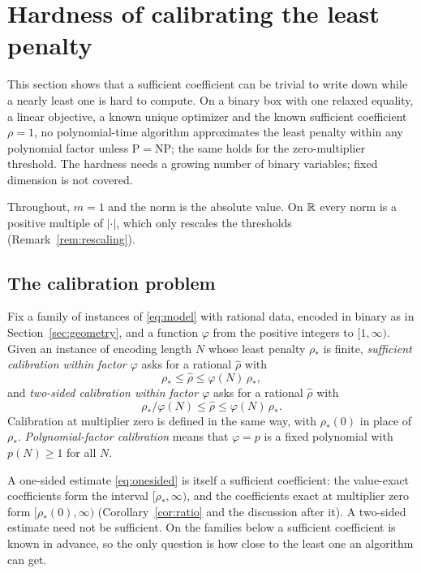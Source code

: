 \section{Hardness of calibrating the least penalty}\label{sec:calibration}
This section shows that a sufficient coefficient can be trivial to write
down while a nearly least one is hard to compute. On a binary box with one
relaxed equality, a linear objective, a known unique optimizer and the
known sufficient coefficient $\rho=1$, no polynomial-time algorithm
approximates the least penalty within any polynomial factor unless
$\mathrm P=\mathrm{NP}$; the same holds for the zero-multiplier threshold.
The hardness needs a growing number of binary variables; fixed dimension is
not covered.

Throughout, $m=1$ and the norm is the absolute value. On $\mathbb R$ every norm is
a positive multiple of $|\cdot|$, which only rescales the thresholds
(Remark~\ref{rem:rescaling}).

\subsection{The calibration problem}
\begin{definition}[Calibration]\label{def:calibration}
Fix a family of instances of \eqref{eq:model} with rational data, encoded
in binary as in Section~\ref{sec:geometry}, and a function $\varphi$ from the
positive integers to $[1,\infty)$. Given an instance of encoding length $N$
whose least penalty $\rho_*$ is finite, \emph{sufficient calibration within
factor $\varphi$} asks for a rational $\widehat\rho$ with
\begin{equation}\label{eq:onesided}
 \rho_*\le\widehat\rho\le \varphi(N)\,\rho_*,
\end{equation}
and \emph{two-sided calibration within factor $\varphi$} asks for a rational
$\widehat\rho$ with
\begin{equation}\label{eq:twosided}
 \rho_*/\varphi(N)\le\widehat\rho\le \varphi(N)\,\rho_*.
\end{equation}
Calibration at multiplier zero is defined in the same way, with
$\rho_*(0)$ in place of $\rho_*$. \emph{Polynomial-factor calibration}
means that $\varphi=p$ is a fixed polynomial with $p(N)\ge1$ for all $N$.
\end{definition}

A one-sided estimate \eqref{eq:onesided} is itself a sufficient
coefficient: the value-exact coefficients form the interval
$[\rho_*,\infty)$, and the coefficients exact at multiplier zero form
$[\rho_*(0),\infty)$ (Corollary~\ref{cor:ratio} and the discussion after
it). A two-sided estimate need not be sufficient. On the families below a
sufficient coefficient is known in advance, so the only question is how
close to the least one an algorithm can get.

